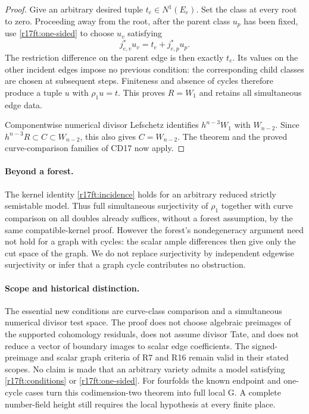 \begin{proof}
Give an arbitrary desired tuple $t_e\in N^1(E_e)$.
Set the class at every root to zero.  Proceeding away from
the root, after the parent class $u_p$ has been fixed, use
\eqref{r17ft:one-sided} to choose $u_v$ satisfying
\[
           j_{e,v}^*u_v=t_e+j_{e,p}^*u_p.
\]
The restriction difference on the parent edge is then exactly
$t_e$.  Its values on the other incident edges impose no
previous condition: the corresponding child classes are
chosen at subsequent steps.  Finiteness and absence of cycles
therefore produce a tuple $u$ with $\rho_1u=t$.
This proves $R=W_1$ and retains all simultaneous edge data.

Componentwise numerical divisor Lefschetz identifies
$h^{n-3}W_1$ with $W_{n-2}$.  Since
$h^{n-3}R\subset C\subset W_{n-2}$, this also gives
$C=W_{n-2}$.  The theorem and the proved curve-comparison
families of CD17 now apply.
\end{proof}

\paragraph{Beyond a forest.}
The kernel identity \eqref{r17ft:incidence} holds for an
arbitrary reduced strictly semistable model.  Thus full
simultaneous surjectivity of $\rho_1$ together with curve
comparison on all doubles already suffices, without a
forest assumption, by the same compatible-kernel proof.
However the forest's nondegeneracy argument need not hold
for a graph with cycles: the scalar ample differences then
give only the cut space of the graph.  We do not replace
surjectivity by independent edgewise surjectivity or infer
that a graph cycle contributes no obstruction.

\paragraph{Scope and historical distinction.}
The essential new conditions are curve-class comparison
and a simultaneous numerical divisor test space.  The
proof does not choose algebraic preimages of the supported
cohomology residuals, does not assume divisor Tate, and
does not reduce a vector of boundary images to scalar
edge coefficients.  The signed-preimage and scalar graph
criteria of R7 and R16 remain valid in their stated scopes.
No claim is made that an arbitrary variety admits a model
satisfying \eqref{r17ft:conditions} or \eqref{r17ft:one-sided}.
For fourfolds the known endpoint and one-cycle cases turn
this codimension-two theorem into full local G.  A complete
number-field height still requires the local hypothesis
at every finite place.
